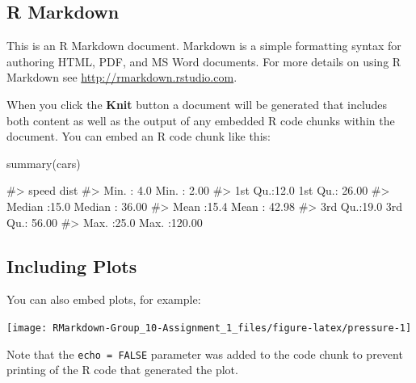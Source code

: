 \hypertarget{r-markdown}{%
\subsection{R Markdown}\label{r-markdown}}

This is an R Markdown document. Markdown is a simple formatting syntax
for authoring HTML, PDF, and MS Word documents. For more details on
using R Markdown see \url{http://rmarkdown.rstudio.com}.

When you click the \textbf{Knit} button a document will be generated
that includes both content as well as the output of any embedded R code
chunks within the document. You can embed an R code chunk like this:

\begin{Schunk}
\begin{Sinput}
summary(cars)
\end{Sinput}
\begin{Soutput}
#>      speed           dist       
#>  Min.   : 4.0   Min.   :  2.00  
#>  1st Qu.:12.0   1st Qu.: 26.00  
#>  Median :15.0   Median : 36.00  
#>  Mean   :15.4   Mean   : 42.98  
#>  3rd Qu.:19.0   3rd Qu.: 56.00  
#>  Max.   :25.0   Max.   :120.00
\end{Soutput}
\end{Schunk}

\hypertarget{including-plots}{%
\subsection{Including Plots}\label{including-plots}}

You can also embed plots, for example:

\begin{Schunk}

\texttt{[image: RMarkdown-Group\_10-Assignment\_1\_files/figure-latex/pressure-1]} \end{Schunk}

Note that the \texttt{echo\ =\ FALSE} parameter was added to the code
chunk to prevent printing of the R code that generated the plot.


\address{%
Alex Fung\\
\\
\\
}


\address{%
Viswesh Krishnamurthy\\
\\
\\
}


\address{%
Tony Lee\\
\\
\\
}


\address{%
Patrick Osborne\\
\\
\\
}



